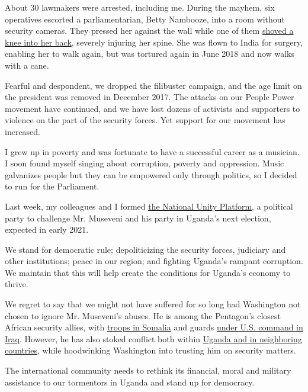 About 30 lawmakers were arrested, including me. During the mayhem, six
operatives escorted a parliamentarian, Betty Nambooze, into a room
without security cameras. They pressed her against the wall while one of
them
\href{https://www.thenation.com/article/archive/us-turns-blind-eye-ugandas-assault-democracy/}{shoved
a knee into her back}, severely injuring her spine. She was flown to
India for surgery, enabling her to walk again, but was tortured again in
June 2018 and now walks with a cane.

Fearful and despondent, we dropped the filibuster campaign, and the age
limit on the president was removed in December 2017. The attacks on our
People Power movement have continued, and we have lost dozens of
activists and supporters to violence on the part of the security forces.
Yet support for our movement has increased.

I grew up in poverty and was fortunate to have a successful career as a
musician. I soon found myself singing about corruption, poverty and
oppression. Music galvanizes people but they can be empowered only
through politics, so I decided to run for the Parliament.

Last week, my colleagues and I formed
\href{https://www.nytimes3xbfgragh.onion/aponline/2020/07/22/world/africa/ap-af-uganda-bobi-wine.html}{the
National Unity Platform}, a political party to challenge Mr. Museveni
and his party in Uganda's next election, expected in early 2021.

We stand for democratic rule; depoliticizing the security forces,
judiciary and other institutions; peace in our region; and fighting
Uganda's rampant corruption. We maintain that this will help create the
conditions for Uganda's economy to thrive.

We regret to say that we might not have suffered for so long had
Washington not chosen to ignore Mr. Museveni's abuses. He is among the
Pentagon's closest African security allies, with
\href{https://www.amazon.com/dp/B074CY9SZN/ref=dp-kindle-redirect?_encoding=UTF8\&btkr=1\#customerReviews}{troops
in Somalia} and guards
\href{https://theintercept.com/2016/02/22/wounded-in-iraq-ugandan-contractors-fight-for-compensation-in-america/}{under
U.S. command in Iraq}. However, he has also stoked conflict both within
\href{https://www.dw.com/en/ugandas-double-game-in-south-sudan-civil-war-revealed/a-46500925}{Uganda
and in neighboring countries}, while hoodwinking Washington into
trusting him on security matters.

The international community needs to rethink its financial, moral and
military assistance to our tormentors in Uganda and stand up for
democracy.

